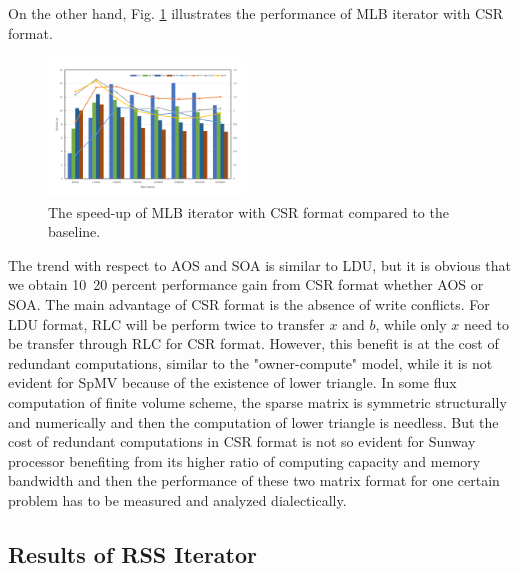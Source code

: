 \documentclass[conference]{IEEEtran}
\begin{document}
On the other hand, Fig. \ref{mlbcsr} illustrates the performance of MLB iterator with CSR format.
\begin{figure}[tbp]
\centerline{\includegraphics[width=0.47\textwidth]{mlb(csr).pdf}}
\caption{The speed-up of MLB iterator with CSR format compared to the baseline.}
\label{mlbcsr}
\end{figure}
The trend with respect to AOS and SOA is similar to LDU, but it is obvious that we obtain 10~20 percent performance gain from CSR format whether AOS or SOA. The main advantage of CSR format is the absence of write conflicts. For LDU format, RLC will be perform twice to transfer $x$ and $b$, while only $x$ need to be transfer through RLC for CSR format. However, this benefit is at the cost of redundant computations, similar to the "owner-compute" model\cite{b12}, while it is not evident for SpMV because of the existence of lower triangle. In some flux computation of finite volume scheme, the sparse matrix is symmetric structurally and numerically and then the computation of lower triangle is needless. But the cost of redundant computations in CSR format is not so evident for Sunway processor benefiting from its higher ratio of computing capacity and memory bandwidth and then the performance of these two matrix format for one certain problem has to be measured and analyzed dialectically.

\subsection{Results of RSS Iterator}
\end{document}
